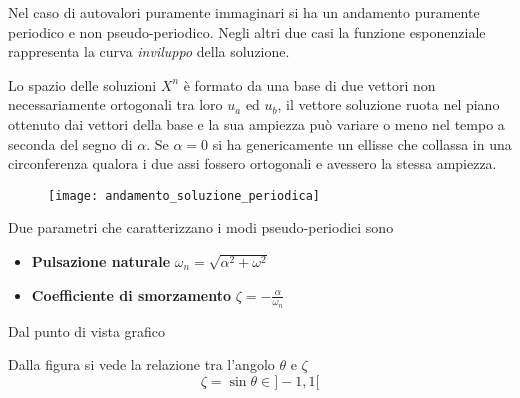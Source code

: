 Nel caso di autovalori puramente immaginari si ha un andamento puramente
periodico e non pseudo-periodico.
Negli altri due casi la funzione esponenziale rappresenta la curva
\textit{inviluppo} della soluzione.

Lo spazio delle soluzioni $X^n$ è formato da una base di due vettori non
necessariamente ortogonali tra loro $u_a$ ed $u_b$, il vettore soluzione ruota
nel piano ottenuto dai vettori della base e la sua ampiezza può variare o meno
nel tempo a seconda del segno di $\alpha$.
Se $\alpha=0$ si ha genericamente un ellisse che collassa in una circonferenza
qualora i due assi fossero ortogonali e avessero la stessa ampiezza.

\begin{figure}[h]
\centering
\texttt{[image: andamento\_soluzione\_periodica]}
\end{figure}

Due parametri che caratterizzano i modi pseudo-periodici sono
\begin{itemize}
\item \textbf{Pulsazione naturale} $\omega_n =
\sqrt{\alpha^2+\omega^2}$
\item \textbf{Coefficiente di smorzamento} $\zeta =
-\frac{\alpha}{\omega_n}$
\end{itemize}

\newpage
Dal punto di vista grafico
\begin{figure}[H]
\centering
{}
\end{figure}
Dalla figura si vede la relazione tra l'angolo $\theta$ e $\zeta$
$$\zeta = \sin\theta \in ]-1,1[$$

